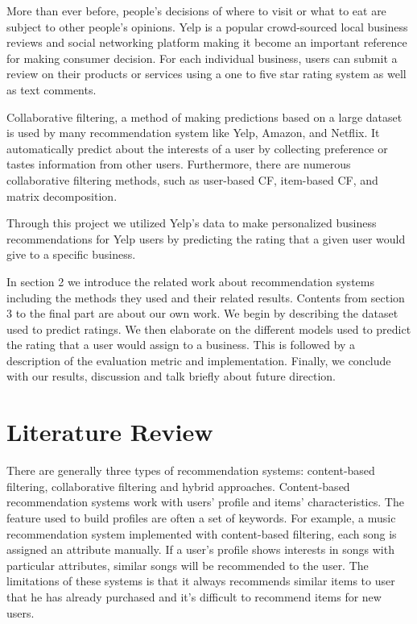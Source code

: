 \documentclass{llncs}
\begin{document}
More than ever before, people's decisions of where to visit or what to eat are subject to other people's opinions. Yelp is a popular crowd-sourced local business reviews and social networking platform making it become an important reference for making consumer decision. For each individual business, users can submit a review on their products or services using a one to five star rating system as well as text comments.

Collaborative filtering, a method of making predictions based on a large dataset is used by many recommendation system like Yelp, Amazon, and Netflix. It automatically predict about the interests of a user by collecting preference or tastes information from other users. Furthermore, there are numerous collaborative filtering methods, such as user-based CF, item-based CF, and matrix decomposition. 

Through this project we utilized Yelp's data to make personalized business recommendations for Yelp users by predicting the rating that a given user would give to a specific business.

In section 2 we introduce the related work about recommendation systems including the methods they used and their related results. Contents from section 3 to the final part are about our own work. We begin by describing the dataset used to predict ratings. We then elaborate on the different models used to predict the rating that a user would assign to a business. This is followed by a description of the evaluation metric and implementation. Finally, we conclude with our results, discussion and talk briefly about future direction.

\section{Literature Review}
There are generally three types of recommendation systems: content-based filtering, collaborative filtering and hybrid approaches. Content-based recommendation systems work with users' profile and items' characteristics. The feature used to build profiles are often a set of keywords. For example, a music recommendation system\cite{MJ} implemented with content-based filtering, each song is assigned an attribute manually. If a user’s profile shows interests in songs with particular attributes, similar songs will be recommended to the user. The limitations of these systems is that it always recommends similar items to user that he has already purchased and it’s difficult to recommend items for new users. 
\end{document}
